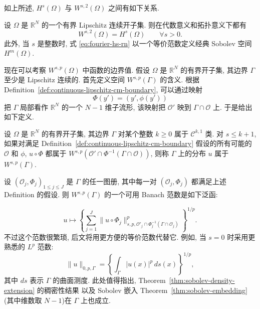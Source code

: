 如上所述, $H^s(\Omega)$ 与 $W^{s,2}(\Omega)$ 之间有如下关系.

\setcounter{statement}{2}
\renewcommand{\theHstatement}{lemma.\thesection.\arabic{statement}}
\begin{Lemma}\label{lem:fractional-hs-equivalence}
设 $\Omega$ 是 $\mathbb R^N$ 的一个有界 Lipschitz 连续开子集. 则在代数意义和拓扑意义下都有
\[
W^{s,2}(\Omega)=H^s(\Omega)\qquad\forall s>0.
\]
此外, 当 $s$ 是整数时, 式 \eqref{eq:fourier-hs-rn} 以一个等价范数定义经典 Sobolev 空间 $H^m(\Omega)$.
\end{Lemma}

现在可以考察 $W^{s,p}(\Omega)$ 中函数的边界值. 假设 $\Omega$ 是 $\mathbb R^N$ 的有界开子集,
其边界 $\Gamma$ 至少是 Lipschitz 连续的. 首先定义空间 $W^{s,p}(\Gamma)$ 的含义. 根据
Definition~\ref{def:continuous-lipschitz-cm-boundary}, 可以通过映射
\[
\Phi(y')=(y',\phi(y'))
\]
把 $\Gamma$ 局部看作 $\mathbb R^N$ 的一个 $N-1$ 维子流形, 该映射把 $\mathcal O'$ 映到
$\Gamma\cap\mathcal O$ 上. 于是给出如下定义.

\setcounter{statement}{3}
\renewcommand{\theHstatement}{definition.\thesection.\arabic{statement}}
\begin{Definition}\label{def:boundary-sobolev-space}
设 $\Omega$ 是 $\mathbb R^N$ 的有界开子集, 其边界 $\Gamma$ 对某个整数 $k\geq0$ 属于
$\mathcal C^{k,1}$ 类. 对 $s\leq k+1$, 如果对满足
Definition~\ref{def:continuous-lipschitz-cm-boundary} 假设的所有可能的 $\mathcal O$ 和 $\phi$,
$u\circ\Phi$ 都属于 $W^{s,p}(\mathcal O'\cap\Phi^{-1}(\Gamma\cap\mathcal O))$,
则称 $\Gamma$ 上的分布 $u$ 属于 $W^{s,p}(\Gamma)$.
\end{Definition}

设 $(\mathcal O_j,\Phi_j)_{1\leq j\leq J}$ 是 $\Gamma$ 的任一图册, 其中每一对
$(\mathcal O_j,\Phi_j)$ 都满足上述 Definition 的假设. 则 $W^{s,p}(\Gamma)$ 的一个可用 Banach 范数是如下泛函:

\begin{equation}\label{eq:boundary-sobolev-atlas-norm}
u\mapsto\left\{\sum_{j=1}^J
\|u\circ\Phi_j\|_{s,p,\mathcal O'_j\cap\Phi_j^{-1}(\Gamma\cap\mathcal O_j)}^p
\right\}^{1/p}.
\end{equation}
不过这个范数很繁琐, 后文将用更方便的等价范数代替它. 例如, 当 $s=0$ 时采用更熟悉的 $L^p$ 范数:
\[
\|u\|_{0,p,\Gamma}=\left\{\int_\Gamma|u(x)|^p\,ds(x)\right\}^{1/p},
\]
其中 $ds$ 表示 $\Gamma$ 的曲面测度. 此处值得指出, Theorem~\ref{thm:sobolev-density-extension} 的稠密性结果
以及 Sobolev 嵌入 Theorem~\ref{thm:sobolev-embedding}(其中维数取 $N-1$)在 $\Gamma$ 上也成立.

